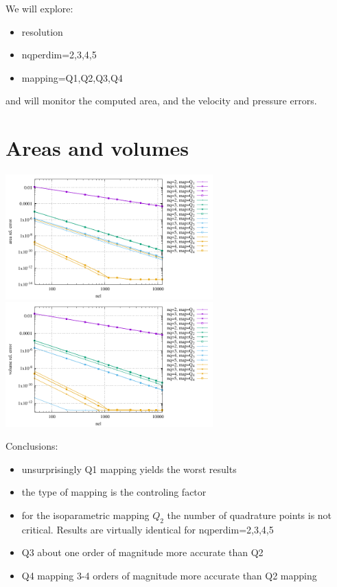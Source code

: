 We will explore:
\begin{itemize}
\item resolution
\item nqperdim=2,3,4,5
\item mapping=Q1,Q2,Q3,Q4
\end{itemize}
and will monitor the computed area, and the velocity and pressure errors.

\section*{Areas and volumes}

\begin{center}
\includegraphics[width=8cm]{python_codes/fieldstone_152/results/areas/areas.pdf}
\includegraphics[width=8cm]{python_codes/fieldstone_152/results/areas/volumes.pdf}
\end{center}

Conclusions:
\begin{itemize}
\item unsurprisingly Q1 mapping yields the worst results
\item the type of mapping is the controling factor
\item for the isoparametric mapping $Q_2$ the number of quadrature points 
is not critical. Results are virtually identical for nqperdim=2,3,4,5
\item Q3 about one order of magnitude more accurate than Q2 
\item Q4 mapping 3-4 orders of magnitude more accurate than Q2 mapping
\end{itemize}








